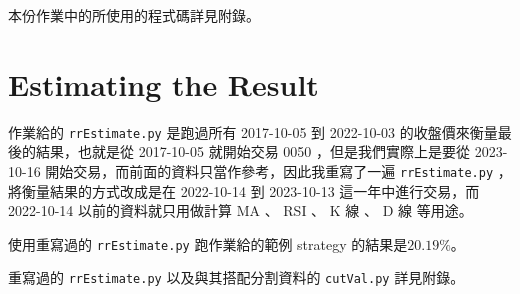 \setcounter{section}{-1}

本份作業中的所使用的程式碼詳見附錄。

\section{Estimating the Result}

作業給的 \texttt{rrEstimate.py} 是跑過所有 2017-10-05 到 2022-10-03 的收盤價來衡量最後的結果，也就是從 2017-10-05 就開始交易 0050 ，但是我們實際上是要從 2023-10-16 開始交易，而前面的資料只當作參考，因此我重寫了一遍 \texttt{rrEstimate.py} ，將衡量結果的方式改成是在 2022-10-14 到 2023-10-13 這一年中進行交易，而 2022-10-14 以前的資料就只用做計算 MA 、 RSI 、 K 線 、 D 線 等用途。

使用重寫過的 \texttt{rrEstimate.py} 跑作業給的範例 strategy 的結果是$20.19\%$。

重寫過的 \texttt{rrEstimate.py} 以及與其搭配分割資料的 \texttt{cutVal.py} 詳見附錄。

